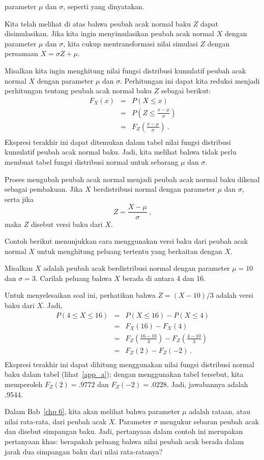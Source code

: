 parameter $\mu$ dan $\sigma$, seperti yang dinyatakan.
\par
Kita telah melihat di atas bahwa peubah acak normal baku $Z$ dapat disimulasikan.
Jika kita ingin menyimulasikan peubah acak normal $X$ dengan parameter $\mu$ dan
$\sigma$, kita cukup mentransformasi nilai simulasi $Z$ dengan persamaan
$X = \sigma Z + \mu$.
\par
Misalkan kita ingin menghitung nilai fungsi distribusi kumulatif peubah acak normal
$X$ dengan parameter $\mu$ dan $\sigma$.  Perhitungan ini dapat kita reduksi menjadi
perhitungan tentang peubah acak normal baku $Z$ sebagai berikut:
\begin{eqnarray*} F_X(x) & = & P(X \leq x) \\
       & = & P\left(Z \leq \frac {x - \mu}\sigma \right) \\
       & = & F_Z\left(\frac {x - \mu}\sigma \right)\ . \\
\end{eqnarray*}
Ekspresi terakhir ini dapat ditemukan dalam tabel nilai fungsi distribusi kumulatif
peubah acak normal baku.  Jadi, kita melihat bahwa tidak perlu membuat tabel fungsi
distribusi normal untuk sebarang $\mu$ dan $\sigma$.
\par
Proses mengubah peubah acak normal menjadi peubah acak normal baku dikenal sebagai
pembakuan.  Jika $X$ berdistribusi normal dengan parameter $\mu$ dan $\sigma$, serta
jika
$$ Z = \frac{X - \mu}\sigma\ ,$$
maka $Z$ disebut versi baku dari $X$.
\par
Contoh berikut menunjukkan cara menggunakan versi baku dari peubah acak normal $X$
untuk menghitung peluang tertentu yang berkaitan dengan $X$.

\begin{example}\label{exam 5.16}
Misalkan $X$ adalah peubah acak berdistribusi normal dengan parameter $\mu = 10$ dan
$\sigma = 3$.  Carilah peluang bahwa $X$ berada di antara 4 dan 16.
\par
Untuk menyelesaikan soal ini, perhatikan bahwa $Z = (X-10)/3$ adalah versi baku dari
$X$.  Jadi,
\begin{eqnarray*}
P(4 \le X \le 16) & = & P(X \le 16) - P(X \le 4) \\
                  & = & F_X(16) - F_X(4) \\
                  & = & F_Z\left(\frac {16 - 10}3 \right) - F_Z\left(\frac {4-10}3 \right) \\
                  & = & F_Z(2) - F_Z(-2)\ . \\
\end{eqnarray*} 
Ekspresi terakhir ini dapat dihitung menggunakan nilai fungsi distribusi normal baku
dalam tabel (lihat~\ref{app_a}); dengan menggunakan tabel tersebut, kita memperoleh
$F_Z(2) = .9772$ dan $F_Z(-2) = .0228$.  Jadi, jawabannya adalah .9544.
\par
Dalam Bab~\ref{chp 6}, kita akan melihat bahwa parameter $\mu$ adalah rataan, atau
nilai rata-rata, dari peubah acak $X$.  Parameter $\sigma$ mengukur sebaran
peubah acak dan disebut simpangan baku.  Jadi, pertanyaan dalam contoh ini merupakan
pertanyaan khas: berapakah peluang bahwa nilai peubah acak berada dalam jarak dua
simpangan baku dari nilai rata-ratanya?
\end{example}

